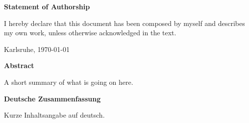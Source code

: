 \documentclass{thesisclass}
\begin{document}

\frontmatter
{}

\blankpage


\thispagestyle{plain}

\vspace*{\fill}

\centerline{\textbf{Statement of Authorship}}

\vspace{0.25cm}

I hereby declare that this document has been composed by myself and describes my own work, unless otherwise acknowledged in the text.

\vspace{2.5cm}

\hspace{0.25cm} Karlsruhe, \today

\vspace{2cm}

\blankpage


\thispagestyle{plain}

\begin{addmargin}{0.5cm}

\centerline{\textbf{Abstract}}

A short summary of what is going on here.

\vskip 2cm

\centerline{\textbf{Deutsche Zusammenfassung}}

Kurze Inhaltsangabe auf deutsch.

\end{addmargin}

\blankpage


\tableofcontents
\blankpage


\mainmatter
{}







\cleardoublepage
{}
{}

{}
{} %





\cleardoublepage

\end{document}
